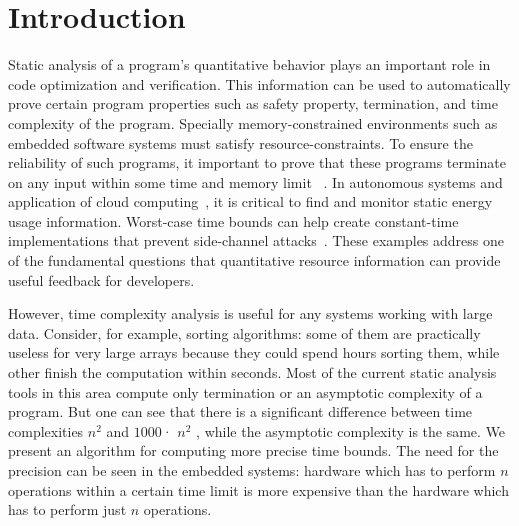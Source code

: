 \section{Introduction}
\label{sec:intro}
Static analysis of a program's quantitative behavior plays an important role in code optimization and verification. This information can be used to automatically prove certain program properties such as safety property, termination, and time complexity of the program. 
Specially memory-constrained environments such as embedded software systems must satisfy resource-constraints. To ensure the reliability of such programs, it important to prove that these programs terminate on any input within some time and memory limit 
~\cite{Regehr:2005:ESO:1113830.1113833}. In autonomous systems and application of cloud computing~\cite{Carroll:2010:APC:1855840.1855861,Cohen:2012:ET:2398857.2384676}, it is critical to find and monitor static energy usage information. Worst-case time bounds
can help create constant-time implementations that prevent side-channel attacks~\cite{Barthe:2014:SNC:2660267.2660283,Kasper:2009:FTR:1617722.1617724}. These examples address one of the fundamental questions that quantitative resource information can provide useful feedback for developers.

However, time complexity analysis is useful for any systems working with large data. Consider, for example, sorting algorithms: some of them are practically useless for very large arrays because they could spend hours sorting them, while other finish the computation within seconds. Most of the current static analysis tools in this area compute only termination or an asymptotic complexity of a program. But one can see that there is a significant difference between time complexities $n^2$ and $1000$· $n^2$ , while the asymptotic complexity is the same. We present an algorithm for computing more precise time bounds. The need for the precision can be seen in the embedded systems: hardware which has to perform $n$ operations within a certain time limit is more expensive than the hardware which has to perform just $n$ operations.

